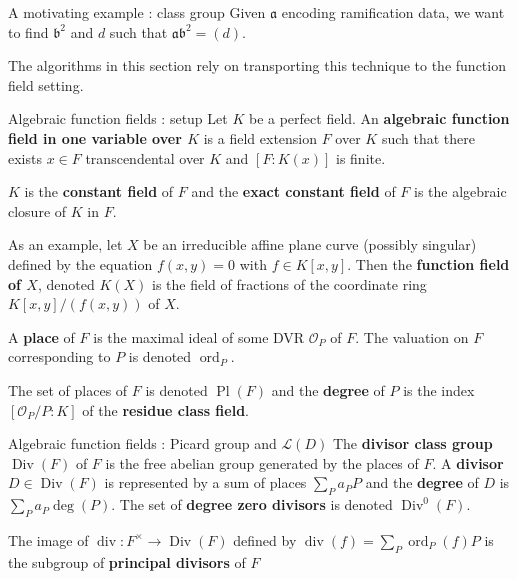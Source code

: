\documentclass[xcolor=dvipsnames,handout]{beamer}
\theoremstyle{plain}
\DeclareMathOperator{\Div}{Div}
\DeclareMathOperator{\ddiv}{div}
\DeclareMathOperator{\ord}{ord}
\DeclareMathOperator{\Pl}{Pl}
\begin{document}
{\begin{frame}{A motivating example : class group}
      Given $\mathfrak{a}$ encoding ramification data,
      we want to find $\mathfrak{b}^2$ and $d$
      such that $\mathfrak{a}\mathfrak{b}^2=(d)$.
      \pause\par
      The algorithms in this section
      rely on transporting this technique
      to the function field setting.
    \end{frame}
    \begin{frame}{Algebraic function fields : setup}
      Let $K$ be a perfect field.
      An \textbf{algebraic function field in one variable over $K$}
      is a field extension $F$ over $K$ such that there exists
      $x\in F$ transcendental over $K$ and
      $[F:K(x)]$ is finite.
      \pause\par
      $K$ is the \textbf{constant field} of $F$
      and the \textbf{exact constant field} of $F$
      is the algebraic closure of $K$ in $F$.
      \pause\par
      As an example,
      let $X$ be an irreducible affine plane curve
      (possibly singular)
      defined by the equation $f(x,y)=0$
      with $f\in K[x,y]$.
      Then the
      \textbf{function field of $X$},
      denoted $K(X)$ is the field of fractions
      of the coordinate ring $K[x,y]/(f(x,y))$
      of $X$.
      \pause\par
      A \textbf{place} of $F$ is the maximal ideal
      of some DVR
      $\mathcal{O}_P$ of $F$.
      The valuation on $F$ corresponding to $P$ is
      denoted $\ord_P$.
      \pause\par
      The set of places of $F$ is denoted
      $\Pl(F)$ and the \textbf{degree}
      of $P$ is the index
      $[\mathcal{O}_P/P:K]$ of the
      \textbf{residue class field}.
    \end{frame}
    \begin{frame}{Algebraic function fields : Picard group and $\mathscr{L}(D)$}
      The \textbf{divisor class group}
      $\Div(F)$ of $F$ is the free abelian group
      generated by the places of $F$.
      A \textbf{divisor} $D\in\Div(F)$ is represented by
      a sum of places $\sum_{P}a_PP$
      and the \textbf{degree}
      of $D$ is $\sum_{P}a_P\deg(P)$.
      \newline
      The set of \textbf{degree zero divisors} is denoted
      $\Div^0(F)$.
      \pause\par
      The image of $\ddiv\colon F^\times\to\Div(F)$ defined by
      $
        \ddiv(f) = \sum_{P}\ord_P(f)P
      $
      is the subgroup of
      \textbf{principal divisors} of $F$

\end{frame}}
\end{document}
